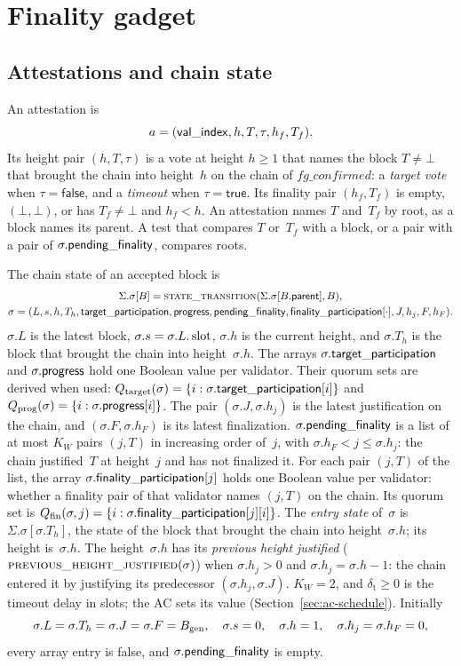 \section{Finality gadget}\label{sec:fg}

\subsection{Attestations and chain state}\label{sec:fg-state}

An attestation is
\[
 a=(\mathsf{val\_index},h,T,\tau,h_f,T_f).
\]
Its height pair $(h,T,\tau)$ is a vote at height $h\geq1$ that names the
block $T\neq\bot$ that brought the chain into height~$h$ on the
chain of $\mathit{fg\_confirmed}$: a \emph{target vote} when $\tau=\mathsf{false}$, and a
\emph{timeout} when $\tau=\mathsf{true}$.  Its finality pair $(h_f,T_f)$ is
empty, $(\bot,\bot)$, or has $T_f\neq\bot$ and $h_f<h$.
An attestation names $T$ and~$T_f$ by root, as a block names its parent.  A
test that compares $T$ or~$T_f$ with a block, or a pair with a pair of
$\sigma.\mathsf{pending\_finality}$, compares roots.

The chain state of an accepted block is
\[
 \begin{gathered}
 \Sigma.\sigma[B]=\Call{state\_transition}{\Sigma.\sigma[B.\parent],B},\\
 \sigma=(L,s,h,T_h,\targetParticipation,\progressBit,\pendingFinality,\finalityParticipation[\cdot],J,h_j,F,h_F).
 \end{gathered}
\]
$\sigma.L$ is the latest block, $\sigma.s=\sigma.L.\operatorname{slot}$, $\sigma.h$ is
the current height, and $\sigma.T_h$ is the block that brought the chain
into height~$\sigma.h$.  The arrays $\sigma.\mathsf{target\_participation}$ and
$\sigma.\mathsf{progress}$ hold one Boolean value per validator.  Their quorum
sets are derived when used:
$Q_{\mathrm{target}}(\sigma)=\{i:\sigma.\mathsf{target\_participation}[i]\}$ and
$Q_{\mathrm{prog}}(\sigma)=\{i:\sigma.\mathsf{progress}[i]\}$.  The pair
$(\sigma.J,\sigma.h_j)$ is the latest justification on the chain, and
$(\sigma.F,\sigma.h_F)$ is its latest finalization.  $\sigma.\mathsf{pending\_finality}$ is a list of at most $K_W$ pairs $(j,T)$ in
increasing order of~$j$, with $\sigma.h_F<j\leq\sigma.h_j$: the chain
justified~$T$ at height~$j$ and has not finalized it.  For each pair
$(j,T)$ of the list, the array $\sigma.\mathsf{finality\_participation}[j]$ holds
one Boolean value per validator: whether a finality pair of that
validator names $(j,T)$ on the chain.  Its quorum set is
$Q_{\mathrm{fin}}(\sigma,j)=\{i:\sigma.\mathsf{finality\_participation}[j][i]\}$.  The
\emph{entry state} of~$\sigma$ is $\Sigma.\sigma[\sigma.T_h]$, the state
of the block that brought the chain into height~$\sigma.h$; its height
is~$\sigma.h$.  The height~$\sigma.h$ has its \emph{previous height
justified} ($\Call{previous\_height\_justified}{\sigma}$) when
$\sigma.h_j>0$ and $\sigma.h_j=\sigma.h-1$: the chain entered it by
justifying its predecessor $(\sigma.h_j,\sigma.J)$.  $K_W=2$, and
$\delta_{\mathrm{t}}\geq0$ is the timeout delay in slots; the AC sets its
value (Section~\ref{sec:ac-schedule}).  Initially
\[
 \sigma.L=\sigma.T_h=\sigma.J=\sigma.F=B_{\mathrm{gen}},\quad
 \sigma.s=0,\quad \sigma.h=1,\quad \sigma.h_j=\sigma.h_F=0,
\]
every array entry is false, and $\sigma.\mathsf{pending\_finality}$ is empty.

